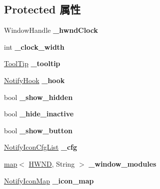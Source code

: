 \subsection*{Protected 属性}
\begin{DoxyCompactItemize}
\item 
\mbox{\label{struct_notify_area_af3a3ed1dd054194effac22bd80210005}} 
Window\+Handle {\bfseries \+\_\+hwnd\+Clock}
\item 
\mbox{\label{struct_notify_area_a8f2699acbc90b85aa1c3dc94fb963665}} 
int {\bfseries \+\_\+clock\+\_\+width}
\item 
\mbox{\label{struct_notify_area_a56678ab3be8649c269c0104c3e6999ed}} 
\hyperlink{struct_tool_tip}{Tool\+Tip} {\bfseries \+\_\+tooltip}
\item 
\mbox{\label{struct_notify_area_a3b54a138a8bd140494e8fd0b87872b9e}} 
\hyperlink{struct_notify_hook}{Notify\+Hook} {\bfseries \+\_\+hook}
\item 
\mbox{\label{struct_notify_area_a86317ccb0eca102e587ed5613200b2dc}} 
bool {\bfseries \+\_\+show\+\_\+hidden}
\item 
\mbox{\label{struct_notify_area_a60e97e5055bfb40d94c4f5cd99f09d7b}} 
bool {\bfseries \+\_\+hide\+\_\+inactive}
\item 
\mbox{\label{struct_notify_area_a14bc6973a0d56be42f7a5c9942cfdb37}} 
bool {\bfseries \+\_\+show\+\_\+button}
\item 
\mbox{\label{struct_notify_area_a9b5831b29e819a30cd8ff7af53fdcb17}} 
\hyperlink{classlist}{Notify\+Icon\+Cfg\+List} {\bfseries \+\_\+cfg}
\item 
\mbox{\label{struct_notify_area_ab3ecc7f8cd55c8b9e7ae2d4c5ee83fef}} 
\hyperlink{classmap}{map}$<$ \hyperlink{interfacevoid}{H\+W\+ND}, String $>$ {\bfseries \+\_\+window\+\_\+modules}
\item 
\mbox{\label{struct_notify_area_a51730d361084197ee30fc32b2d076240}} 
\hyperlink{classmap}{Notify\+Icon\+Map} {\bfseries \+\_\+icon\+\_\+map}

\end{DoxyCompactItemize}
